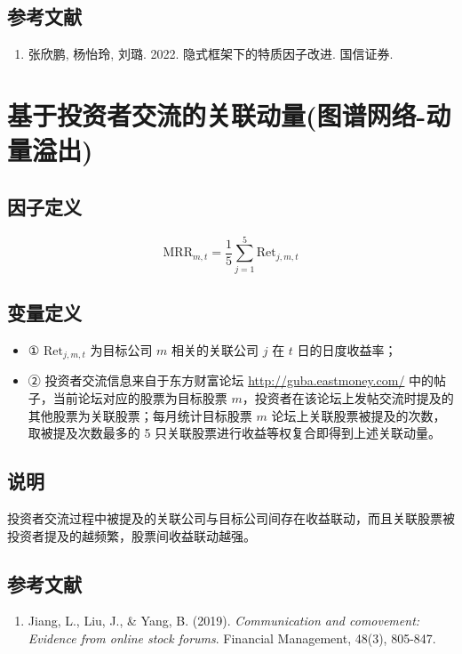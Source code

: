 \documentclass{article}
\begin{document}
\subsection{参考文献}
\begin{enumerate}
    \item 张欣鹏, 杨怡玲, 刘璐. 2022. 隐式框架下的特质因子改进. 国信证券.
\end{enumerate}

\section{基于投资者交流的关联动量(图谱网络-动量溢出)}

\subsection{因子定义}
\begin{equation}
    \mathrm{MRR}_{m,t} = \frac{1}{5} \sum_{j=1}^{5} \mathrm{Ret}_{j,m,t}
\end{equation}

\subsection{变量定义}
\begin{itemize}
    \item ① \( \mathrm{Ret}_{j,m,t} \) 为目标公司 \( m \) 相关的关联公司 \( j \) 在 \( t \) 日的日度收益率；
    \item ② 投资者交流信息来自于东方财富论坛 \url{http://guba.eastmoney.com/} 中的帖子，当前论坛对应的股票为目标股票 \( m \)，投资者在该论坛上发帖交流时提及的其他股票为关联股票；每月统计目标股票 \( m \) 论坛上关联股票被提及的次数，取被提及次数最多的 5 只关联股票进行收益等权复合即得到上述关联动量。
\end{itemize}

\subsection{说明}
投资者交流过程中被提及的关联公司与目标公司间存在收益联动，而且关联股票被投资者提及的越频繁，股票间收益联动越强。

\subsection{参考文献}
\begin{enumerate}
    \item Jiang, L., Liu, J., \& Yang, B. (2019). \textit{Communication and comovement: Evidence from online stock forums}. Financial Management, 48(3), 805-847.
\end{enumerate}
\end{document}
